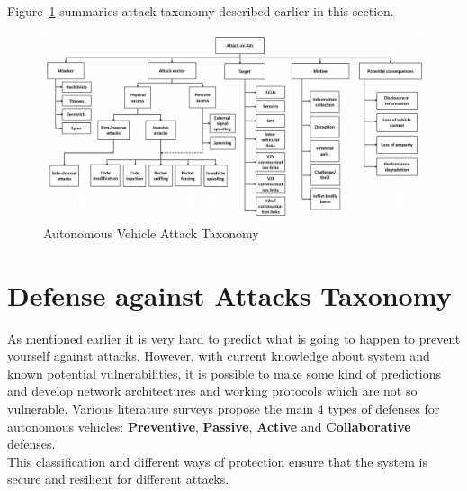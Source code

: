 Figure~\ref{fig:AttackTaxonomy} summaries attack taxonomy described earlier in this section.

\begin{figure}[h]
	\centering  	
	\includegraphics[width=15cm]{img/6.jpg}
	\caption{Autonomous Vehicle Attack Taxonomy \cite{sec}}
	\label{fig:AttackTaxonomy}    
\end{figure}

\section{Defense against Attacks Taxonomy}

As mentioned earlier it is very hard to predict what is going to happen to prevent yourself against attacks. However, with current knowledge about system and known potential vulnerabilities, it is possible to make some kind of predictions and develop network architectures and working protocols which are not so vulnerable. Various literature surveys propose the main 4 types of defenses for autonomous vehicles: \textbf{Preventive}, \textbf{Passive}, \textbf{Active} and \textbf{Collaborative} defenses. \\

This classification and different ways of protection ensure that the system is secure and resilient for different attacks.

